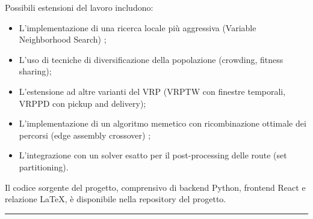 Possibili estensioni del lavoro includono:
\begin{itemize}
    \item L'implementazione di una ricerca locale pi\`u aggressiva (Variable
    Neighborhood Search) \cite{vidal2012unified};
    \item L'uso di tecniche di diversificazione della popolazione (crowding,
    fitness sharing);
    \item L'estensione ad altre varianti del VRP (VRPTW con finestre temporali,
    VRPPD con pickup and delivery);
    \item L'implementazione di un algoritmo memetico con ricombinazione
    ottimale dei percorsi (edge assembly crossover) \cite{vidal2013hybrid};
    \item L'integrazione con un solver esatto per il post-processing delle
    route (set partitioning).
\end{itemize}

Il codice sorgente del progetto, comprensivo di backend Python, frontend React
e relazione \LaTeX, \`e disponibile nella repository del progetto.

\vspace{1cm}
\begin{center}
\rule{0.5\textwidth}{0.5mm}
\end{center}

